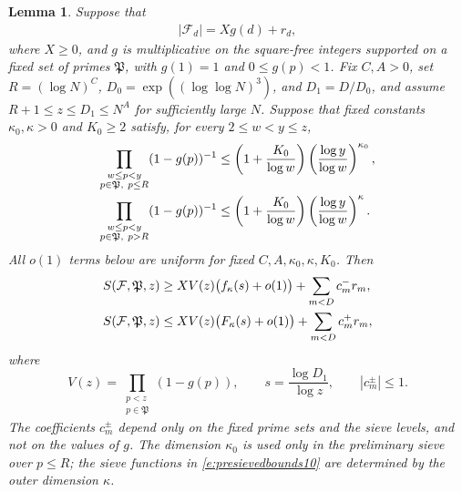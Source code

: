 \documentclass[12pt,reqno]{amsart}
\numberwithin{equation}{section}
\newtheorem{lemma}[equation]{Lemma}
\theoremstyle{definition}
\theoremstyle{remark}
\begin{document}

\begin{lemma}\label{l:presieving}
Suppose that
\begin{align}\label{e:circestsieve}
 |\mathcal F_d|=Xg(d)+r_d,
\end{align}
where \(X\geq0\), and \(g\) is multiplicative on the square-free
integers supported on a fixed set of primes \(\mathfrak P\),
with \(g(1)=1\) and \(0\leq g(p)<1\).
Fix \(C,A>0\), set \(R=(\log N)^C\),
\(D_0=\exp((\log\log N)^3)\), and \(D_1=D/D_0\), and assume
\(R+1\leq z\leq D_1\leq N^A\) for sufficiently large \(N\).
Suppose that fixed constants \(\kappa_0,\kappa>0\) and
\(K_0\geq2\) satisfy, for every \(2\leq w<y\leq z\),
\begin{align}\label{e:tworangesievedimension}
 \prod_{\substack{w\leq p<y\\p\in\mathfrak P,\ p\leq R}}
 (1-g(p))^{-1}
 &\leq
 \left(1+\frac{K_0}{\log w}\right)
 \left(\frac{\log y}{\log w}\right)^{\kappa_0},\notag\\
 \prod_{\substack{w\leq p<y\\p\in\mathfrak P,\ p>R}}
 (1-g(p))^{-1}
 &\leq
 \left(1+\frac{K_0}{\log w}\right)
 \left(\frac{\log y}{\log w}\right)^\kappa.
\end{align}
All \(o(1)\) terms below are uniform for fixed
\(C,A,\kappa_0,\kappa,K_0\).
Then
\begin{align}\label{e:presievedbounds10}
 S(\mathcal F,\mathfrak P,z)
 &\geq XV(z)\bigl(f_\kappa(s)+o(1)\bigr)
 +\sum_{m<D}c_m^-r_m,\notag\\
 S(\mathcal F,\mathfrak P,z)
 &\leq XV(z)\bigl(F_\kappa(s)+o(1)\bigr)
 +\sum_{m<D}c_m^+r_m,
\end{align}
where
\[
 V(z)=\prod_{\substack{p<z\\p\in\mathfrak P}}(1-g(p)),
 \qquad
 s=\frac{\log D_1}{\log z},
 \qquad
 |c_m^\pm|\leq1.
\]
The coefficients \(c_m^\pm\) depend only on the fixed prime sets and
the sieve levels, and not on the values of \(g\).  
The dimension
\(\kappa_0\) is used only in the preliminary sieve over \(p\leq R\);
the sieve functions in \eqref{e:presievedbounds10} are determined by
the outer dimension \(\kappa\).
\end{lemma}
\end{document}
